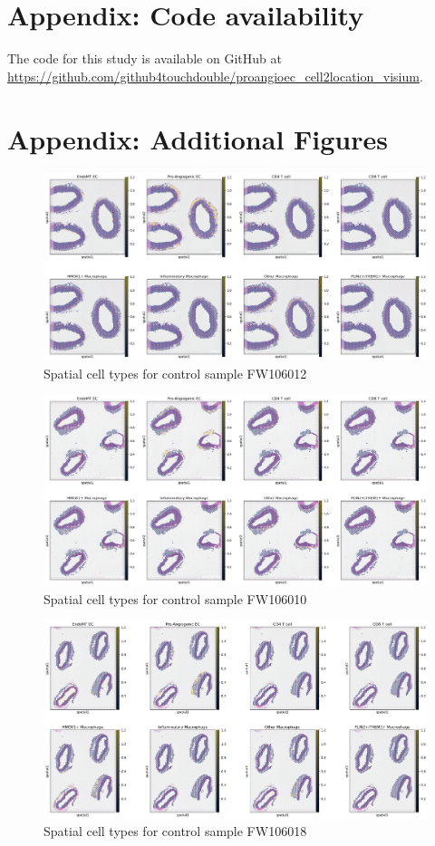 \documentclass[a4paper,12pt]{article}
\begin{document}
\section{Appendix: Code availability}  
The code for this study is available on GitHub at \url{https://github.com/github4touchdouble/proangioec_cell2location_visium}. 

\section{Appendix: Additional Figures}
\begin{figure}[h]
    \centering
    \includegraphics[width=1.1\textwidth]{spatialControl1}
    \caption{Spatial cell types for control sample FW106012}
    \label{fig:appendix1}
\end{figure}
\begin{figure}[h]
    \centering
    \includegraphics[width=1.1\textwidth]{spatialControl2}
    \caption{Spatial cell types for control sample FW106010}
    \label{fig:appendix1}
\end{figure}
\begin{figure}[h]
    \centering
    \includegraphics[width=1.1\textwidth]{spatialControl3}
    \caption{Spatial cell types for control sample FW106018}
    \label{fig:appendix1}
\end{figure}
\end{document}
